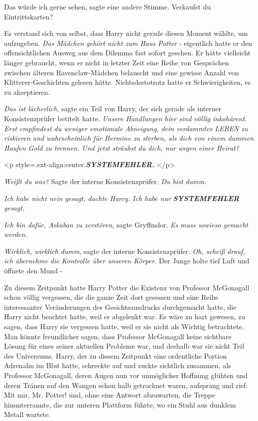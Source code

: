 \glqq Das würde ich gerne sehen\grqq{}, sagte eine andere Stimme. \glqq
Verkaufst du Eintrittskarten?\grqq{}

Es verstand sich von selbst, dass Harry nicht gerade diesen Moment wählte, um
aufzugeben. \emph{Das Mädchen gehört nicht zum Haus Potter }- eigentlich hatte
er den offensichtlichen Ausweg aus dem Dilemma fast sofort gesehen. Er hätte
vielleicht länger gebraucht, wenn er nicht in letzter Zeit eine Reihe von
Gesprächen zwischen älteren Ravenclaw-Mädchen belauscht und eine gewisse Anzahl
von Klitterer-Geschichten gelesen hätte. Nichtsdestotrotz hatte er
Schwierigkeiten, es zu akzeptieren.

\emph{Das ist lächerlich,} sagte ein Teil von Harry, der sich gerade als
interner Konsistenzprüfer betitelt hatte. \emph{Unsere Handlungen hier sind
völlig inkohärent. Erst empfindest du weniger emotionale Abneigung, dein
verdammtes LEBEN zu riskieren und wahrscheinlich für Hermine zu sterben, als
dich von einem dummen Haufen Gold zu trennen. Und jetzt sträubst du dich, nur
wegen einer Heirat?}

<p style=\grqq{}.ext-align:center\grqq{}.\textbf{\emph{SYSTEMFEHLER. }}</p>

\emph{Weißt du was?} Sagte der interne Konsistenzprüfer. \emph{Du bist dumm. }

\emph{Ich habe nicht nein gesagt, dachte Harry. Ich habe nur
}\textbf{\emph{SYSTEMFEHLER}}\emph{ gesagt. }

\emph{Ich bin dafür, Askaban zu zerstören,} sagte Gryffindor. \emph{Es muss
sowieso gemacht werden. }

\emph{Wirklich, wirklich dumm}, sagte der interne Konsistenzprüfer. \emph{Oh,
scheiß drauf, ich übernehme die Kontrolle über unseren Körper. } Der Junge holte
tief Luft und öffnete den Mund -

Zu diesem Zeitpunkt hatte Harry Potter die Existenz von Professor McGonagall
schon völlig vergessen, die die ganze Zeit dort gesessen und eine Reihe
interessanter Veränderungen des Gesichtsausdrucks durchgemacht hatte, die Harry
nicht beachtet hatte, weil er abgelenkt war. Es wäre zu hart gewesen, zu sagen,
dass Harry sie vergessen hatte, weil er sie nicht als Wichtig betrachtete. Man
könnte freundlicher sagen, dass Professor McGonagall keine sichtbare Lösung für
eines seiner aktuellen Probleme war, und deshalb war sie nicht Teil des
Universums. Harry, der zu diesem Zeitpunkt eine ordentliche Portion Adrenalin im
Blut hatte, schreckte auf und zuckte sichtlich zusammen, als Professor
McGonagall, deren Augen nun vor unmöglicher Hoffnung glühten und deren Tränen
auf den Wangen schon halb getrocknet waren, aufsprang und rief: \glqq Mit mir,
Mr. Potter!\grqq{} und, ohne eine Antwort abzuwarten, die Treppe hinunterrannte,
die zur unteren Plattform führte, wo ein Stuhl aus dunklem Metall wartete.

